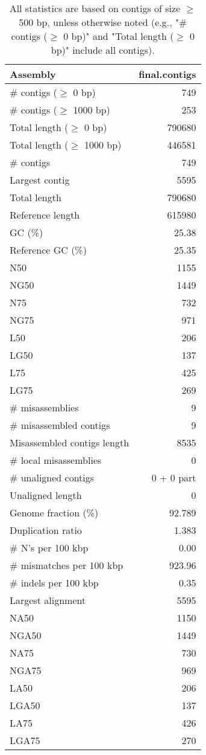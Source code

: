\documentclass[12pt,a4paper]{article}
\begin{document}
\begin{table}[ht]
\begin{center}
\caption{All statistics are based on contigs of size $\geq$ 500 bp, unless otherwise noted (e.g., "\# contigs ($\geq$ 0 bp)" and "Total length ($\geq$ 0 bp)" include all contigs).}
\begin{tabular}{|l*{1}{|r}|}
\hline
Assembly & final.contigs \\ \hline
\# contigs ($\geq$ 0 bp) & 749 \\ \hline
\# contigs ($\geq$ 1000 bp) & 253 \\ \hline
Total length ($\geq$ 0 bp) & 790680 \\ \hline
Total length ($\geq$ 1000 bp) & 446581 \\ \hline
\# contigs & 749 \\ \hline
Largest contig & 5595 \\ \hline
Total length & 790680 \\ \hline
Reference length & 615980 \\ \hline
GC (\%) & 25.38 \\ \hline
Reference GC (\%) & 25.35 \\ \hline
N50 & 1155 \\ \hline
NG50 & 1449 \\ \hline
N75 & 732 \\ \hline
NG75 & 971 \\ \hline
L50 & 206 \\ \hline
LG50 & 137 \\ \hline
L75 & 425 \\ \hline
LG75 & 269 \\ \hline
\# misassemblies & 9 \\ \hline
\# misassembled contigs & 9 \\ \hline
Misassembled contigs length & 8535 \\ \hline
\# local misassemblies & 0 \\ \hline
\# unaligned contigs & 0 + 0 part \\ \hline
Unaligned length & 0 \\ \hline
Genome fraction (\%) & 92.789 \\ \hline
Duplication ratio & 1.383 \\ \hline
\# N's per 100 kbp & 0.00 \\ \hline
\# mismatches per 100 kbp & 923.96 \\ \hline
\# indels per 100 kbp & 0.35 \\ \hline
Largest alignment & 5595 \\ \hline
NA50 & 1150 \\ \hline
NGA50 & 1449 \\ \hline
NA75 & 730 \\ \hline
NGA75 & 969 \\ \hline
LA50 & 206 \\ \hline
LGA50 & 137 \\ \hline
LA75 & 426 \\ \hline
LGA75 & 270 \\ \hline
\end{tabular}
\end{center}
\end{table}
\end{document}
